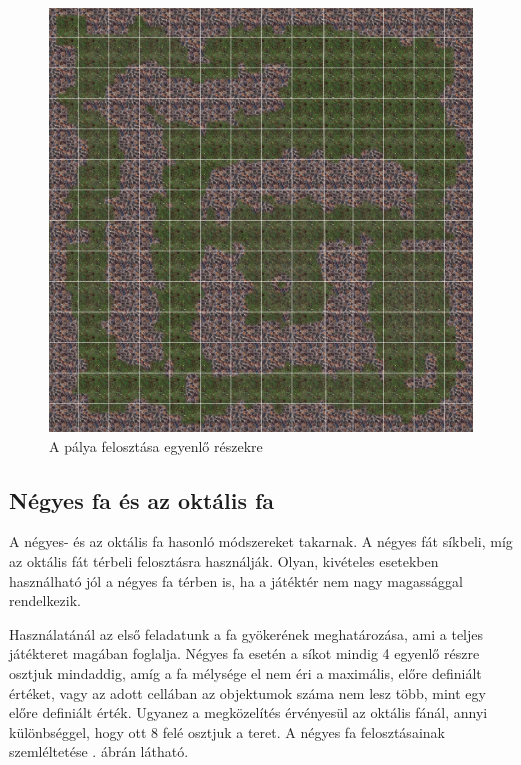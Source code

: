 \begin{figure}[h]
\centering
\includegraphics[scale=0.2]{kepek/grid.png}
\caption{A pálya felosztása egyenlő részekre}
\label{fig:grid}
\end{figure}

\subsection{Négyes fa és az oktális fa}

A négyes- és az oktális fa hasonló módszereket takarnak. A négyes fát síkbeli, míg az oktális fát térbeli felosztásra használják. Olyan, kivételes esetekben használható jól a négyes fa térben is, ha a játéktér nem nagy magassággal rendelkezik.

Használatánál az első feladatunk a fa gyökerének meghatározása, ami a teljes játékteret magában foglalja. Négyes fa esetén a síkot mindig 4 egyenlő részre osztjuk mindaddig, amíg a fa mélysége el nem éri a maximális, előre definiált értéket, vagy az adott cellában az objektumok száma nem lesz több, mint egy előre definiált érték. Ugyanez a megközelítés érvényesül az oktális fánál, annyi különbséggel, hogy ott 8 felé osztjuk a teret. A négyes fa felosztásainak szemléltetése . ábrán látható.


